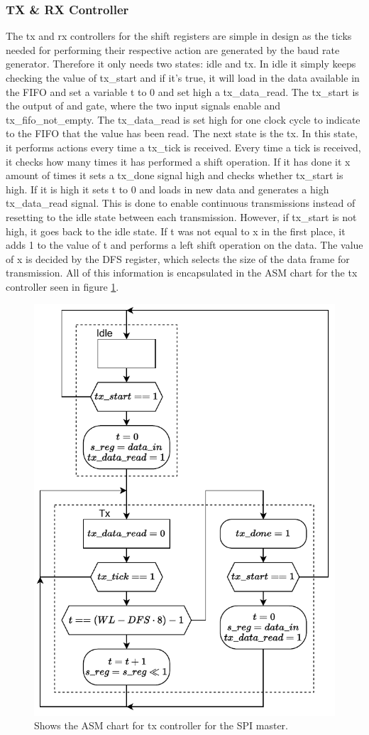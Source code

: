 \documentclass[./dissertation.tex]{subfiles}
\begin{document}
\subsubsection{TX \& RX Controller}
The tx and rx controllers for the shift registers are simple in design as the ticks needed for performing their respective action are generated by the baud rate generator. Therefore it only needs two states: idle and tx. In idle it simply keeps checking the value of tx\_start and if it's true, it will load in the data available in the FIFO and set a variable t to 0 and set high a tx\_data\_read. The tx\_start is the output of and gate, where the two input signals enable and tx\_fifo\_not\_empty. The tx\_data\_read is set high for one clock cycle to indicate to the FIFO that the value has been read. The next state is the tx. In this state, it performs actions every time a tx\_tick is received. Every time a tick is received, it checks how many times it has performed a shift operation. If it has done it x amount of times it sets a tx\_done signal high and checks whether tx\_start is high. If it is high it sets t to 0 and loads in new data and generates a high tx\_data\_read signal. This is done to enable continuous transmissions instead of resetting to the idle state between each transmission. However, if tx\_start is not high, it goes back to the idle state. If t was not equal to x in the first place, it adds 1 to the value of t and performs a left shift operation on the data. The value of x is decided by the DFS register, which selects the size of the data frame for transmission. All of this information is encapsulated in the ASM chart for the tx controller seen in figure \ref{fig:spi_txctrl}.  
\begin{figure}[H]
    \centering
    \includegraphics[width=0.5\linewidth]{subfiles/imgs/IP_Blocks_Pics/spi_txctrl.drawio.pdf}
    \caption{Shows the ASM chart for tx controller for the SPI master.}
    \label{fig:spi_txctrl}
\end{figure}
\end{document}
